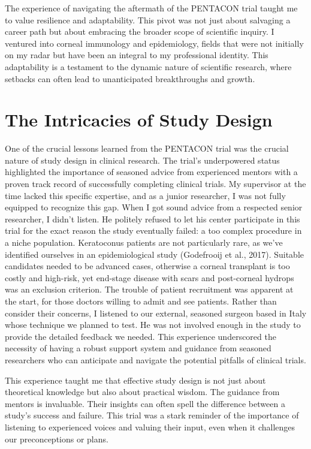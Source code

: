 \documentclass[authordate, empirical]{jote-new-article}
\begin{document}
	The experience of navigating the aftermath of the PENTACON trial taught me to value resilience and adaptability. This pivot was not just about salvaging a career path but about embracing the broader scope of scientific inquiry. I ventured into corneal immunology and epidemiology, fields that were not initially on my radar but have been an integral to my professional identity. This adaptability is a testament to the dynamic nature of scientific research, where setbacks can often lead to unanticipated breakthroughs and growth.



	\section{The Intricacies of Study Design}



	One of the crucial lessons learned from the PENTACON trial was the crucial nature of study design in clinical research. The trial's underpowered status highlighted the importance of seasoned advice from experienced mentors with a proven track record of successfully completing clinical trials. My supervisor at the time lacked this specific expertise, and as a junior researcher, I was not fully equipped to recognize this gap. When I got sound advice from a respected senior researcher, I didn't listen. He politely refused to let his center participate in this trial for the exact reason the study eventually failed: a too complex procedure in a niche population. Keratoconus patients are not particularly rare, as we've identified ourselves in an epidemiological study (Godefrooij et al., 2017). Suitable candidates needed to be advanced cases, otherwise a corneal transplant is too costly and high-risk, yet end-stage disease with scars and post-corneal hydrops was an exclusion criterion. The trouble of patient recruitment was apparent at the start, for those doctors willing to admit and see patients. Rather than consider their concerns, I listened to our external, seasoned surgeon based in Italy whose technique we planned to test. He was not involved enough in the study to provide the detailed feedback we needed. This experience underscored the necessity of having a robust support system and guidance from seasoned researchers who can anticipate and navigate the potential pitfalls of clinical trials.



	This experience taught me that effective study design is not just about theoretical knowledge but also about practical wisdom. The guidance from mentors is invaluable. Their insights can often spell the difference between a study's success and failure. This trial was a stark reminder of the importance of listening to experienced voices and valuing their input, even when it challenges our preconceptions or plans.
\end{document}
